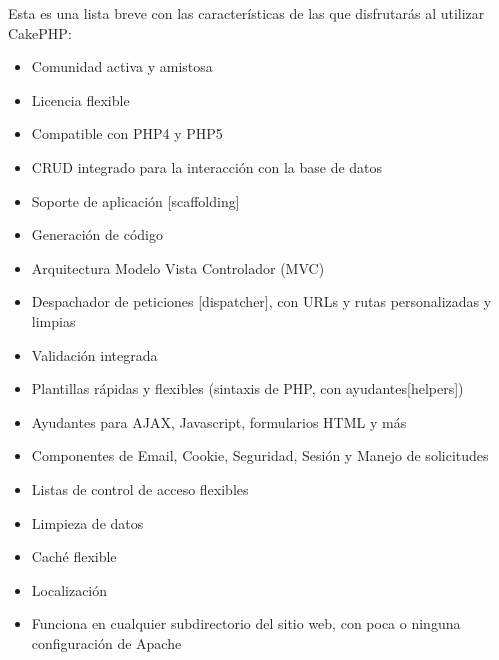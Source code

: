 Esta es una lista breve con las características de las que disfrutarás al utilizar CakePHP:
\setlength{\parskip}{0mm}
\begin{itemize}

	\item Comunidad activa y amistosa

    \item Licencia flexible
    
    \item Compatible con PHP4 y PHP5
    
    \item CRUD integrado para la interacción con la base de datos
    
    \item Soporte de aplicación [scaffolding]
    
    \item Generación de código
    
    \item Arquitectura Modelo Vista Controlador (MVC)
    
    \item Despachador de peticiones [dispatcher], con URLs y rutas personalizadas y limpias
    
    \item Validación integrada
    
    \item Plantillas rápidas y flexibles (sintaxis de PHP, con ayudantes[helpers])
    
    \item Ayudantes para AJAX, Javascript, formularios HTML y más
    
    \item Componentes de Email, Cookie, Seguridad, Sesión y Manejo de solicitudes
    
    \item Listas de control de acceso flexibles
    
    \item Limpieza de datos
    
    \item Caché flexible
    
    \item Localización
    
    \item Funciona en cualquier subdirectorio del sitio web, con poca o ninguna configuración de Apache

	
	
\end{itemize}

